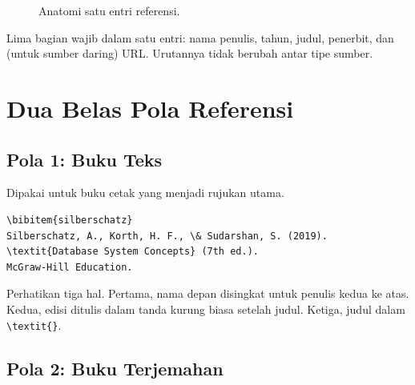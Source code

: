 \documentclass[11pt,a4paper]{article}
\begin{document}
\begin{figure}[H]
	\centering
	\caption{Anatomi satu entri referensi.}
	\label{fig:anatomy-ref}
\end{figure}

Lima bagian wajib dalam satu entri: nama penulis, tahun, judul, penerbit, dan (untuk sumber daring) URL. Urutannya tidak berubah antar tipe sumber.

\section{Dua Belas Pola Referensi}

\subsection{Pola 1: Buku Teks}

Dipakai untuk buku cetak yang menjadi rujukan utama.

\begin{lstlisting}[style=code]
\bibitem{silberschatz}
Silberschatz, A., Korth, H. F., \& Sudarshan, S. (2019).
\textit{Database System Concepts} (7th ed.).
McGraw-Hill Education.
\end{lstlisting}

Perhatikan tiga hal. Pertama, nama depan disingkat untuk penulis kedua ke atas. Kedua, edisi ditulis dalam tanda kurung biasa setelah judul. Ketiga, judul dalam \texttt{\textbackslash textit\{\}}.

\subsection{Pola 2: Buku Terjemahan}
\end{document}
